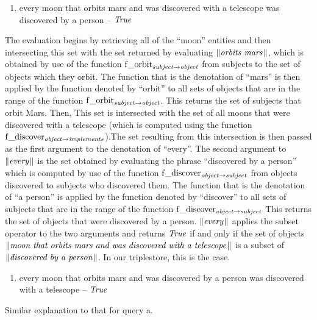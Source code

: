 \documentclass[../main.tex]{subfiles}
\begin{document}
\begin{refsection}
\begin{enumerate}[before=\small, label=\alph*.]
	\setlength\itemsep{0em}
	\item every moon that orbits mars and was discovered with a telescope was discovered by a person – $\operatorname{\mathit{True}}$
\end{enumerate}
The evaluation begins by retrieving all of the ``moon'' entities and then
intersecting this set with the set returned by evaluating $\lVert\textit{orbits mars\hspace{0.1em}}\rVert$, which is obtained by use of the
function $\operatorname{f\_orbit}_{\operatorname{\mathit{subject}} \rightarrow \operatorname{\mathit{object}}}$ from subjects to the set of objects which they orbit. The function that is the
denotation of ``mars'' is then applied by the function denoted by ``orbit'' to all sets of objects that are in
the range of the function $\operatorname{f\_orbit}_{\operatorname{\mathit{subject}} \rightarrow \operatorname{\mathit{object}}}$. This returns the set of subjects that orbit Mars. Then, This set is
intersected with the set of all moons that were discovered with a telescope (which is computed using
the function $\operatorname{f\_discover}_{\operatorname{\mathit{object}} \rightarrow \operatorname{\mathit{implements}}}$).The set resulting from this intersection is then passed as the first
argument to the denotation of ``every''. The second argument to $\lVert\textit{every\hspace{0.1em}}\rVert$ is the set obtained by
evaluating the phrase ``discovered by a person'' which is computed by use of the function $\operatorname{f\_discover}_{\operatorname{\mathit{object}} \rightarrow \operatorname{\mathit{subject}}}$ from objects discovered to subjects who discovered them. The function that is the denotation of ``a
person'' is applied by the function denoted by ``discover'' to all sets of subjects that are in the range of
the function $\operatorname{f\_discover}_{\operatorname{\mathit{object}} \rightarrow \operatorname{\mathit{subject}}}$ This returns the set of objects that were discovered by a person.
$\lVert\textit{every\hspace{0.1em}}\rVert$ applies the subset operator to the two arguments and returns $\operatorname{\mathit{True}}$ if and only if the set of objects
$\lVert\textit{moon that orbits mars and was discovered with a telescope\hspace{0.1em}}\rVert$ is a subset of $\lVert\textit{discovered by a person\hspace{0.1em}}\rVert$. In
our triplestore, this is the case.
\begin{enumerate}[before=\small, label=\alph*.]
	\setlength\itemsep{0em}
	\setcounter{enumi}{1}
	\item every moon that orbits mars and was discovered  by a person was discovered with a telescope – $\operatorname{\mathit{True}}$
\end{enumerate}
\noindent Similar explanation to that for query a.
\begin{enumerate}[before=\small, label=\alph*.]
	\setlength\itemsep{0em}

\end{enumerate}
\end{refsection}
\end{document}
